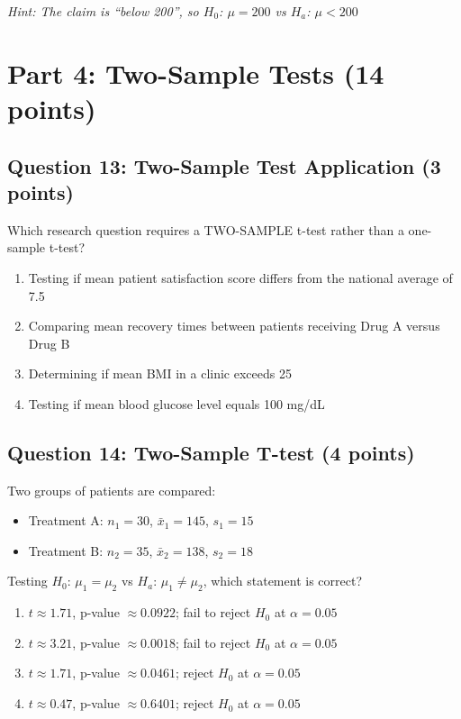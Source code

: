\documentclass[11pt]{article}
\begin{document}
\textit{Hint: The claim is ``below 200'', so $H_0$: $\mu = 200$ vs $H_a$: $\mu < 200$}

\vspace{2cm}

\section{Part 4: Two-Sample Tests (14 points)}

\subsection*{Question 13: Two-Sample Test Application (3 points)}

Which research question requires a TWO-SAMPLE t-test rather than a one-sample t-test?

\begin{enumerate}[label=\Alph*)]
\item Testing if mean patient satisfaction score differs from the national average of 7.5
\item Comparing mean recovery times between patients receiving Drug A versus Drug B
\item Determining if mean BMI in a clinic exceeds 25
\item Testing if mean blood glucose level equals 100 mg/dL
\end{enumerate}

\vspace{0.5cm}

\subsection*{Question 14: Two-Sample T-test (4 points)}

Two groups of patients are compared:

\begin{itemize}
\item Treatment A: $n_1 = 30$, $\bar{x}_1 = 145$, $s_1 = 15$
\item Treatment B: $n_2 = 35$, $\bar{x}_2 = 138$, $s_2 = 18$
\end{itemize}

Testing $H_0$: $\mu_1 = \mu_2$ vs $H_a$: $\mu_1 \neq \mu_2$, which statement is correct?

\begin{enumerate}[label=\Alph*)]
\item $t \approx 1.71$, p-value $\approx 0.0922$; fail to reject $H_0$ at $\alpha = 0.05$
\item $t \approx 3.21$, p-value $\approx 0.0018$; fail to reject $H_0$ at $\alpha = 0.05$
\item $t \approx 1.71$, p-value $\approx 0.0461$; reject $H_0$ at $\alpha = 0.05$
\item $t \approx 0.47$, p-value $\approx 0.6401$; reject $H_0$ at $\alpha = 0.05$
\end{enumerate}
\end{document}
